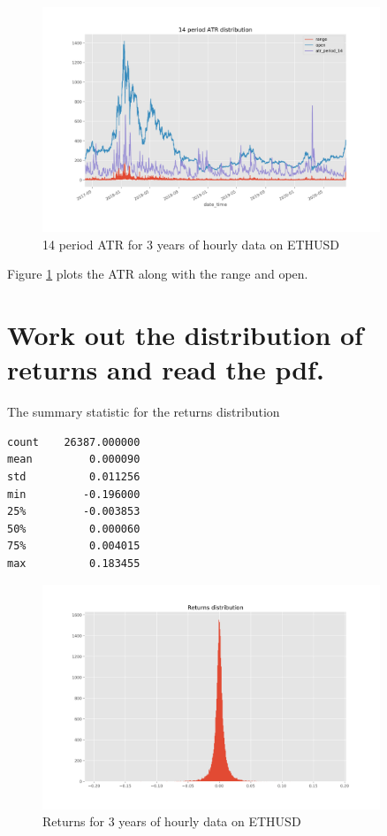 \begin{figure}[H]
\center
\includegraphics[width=0.9\textwidth]{fig/atr.png}
\caption{14 period ATR for 3 years of hourly data on ETHUSD}
\label{fig:atr}
\end{figure}
Figure \ref{fig:atr} plots the ATR along with the range and open.


\section{ Work out the distribution of returns and read the pdf.}
The summary statistic for the returns distribution
\begin{verbatim}
count    26387.000000
mean         0.000090
std          0.011256
min         -0.196000
25%         -0.003853
50%          0.000060
75%          0.004015
max          0.183455
\end{verbatim}

\begin{figure}[H]
\center
\includegraphics[width=0.9\textwidth]{fig/ret.png}
\caption{Returns for 3 years of hourly data on ETHUSD}
\label{fig:ret}
\end{figure}


